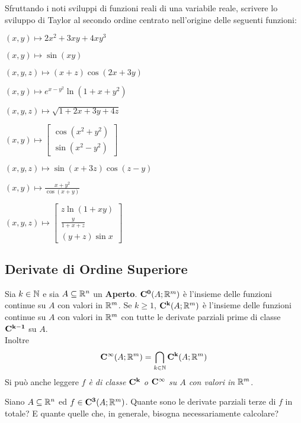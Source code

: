 \begin{exercise}
	Sfruttando i noti sviluppi di funzioni reali di una variabile reale, scrivere lo sviluppo di Taylor al secondo ordine centrato nell'origine delle seguenti funzioni:
	\begin{itemize}
		\begin{minipage}{0.33\linewidth}
			\item $(x,y) \mapsto 2x^2 + 3xy + 4xy^3$
			\item $(x,y) \mapsto \sin(xy)$
			\item $(x,y,z) \mapsto (x+z) \cos (2x+3y)$
		\end{minipage}
		\begin{minipage}{0.33\linewidth}
			\item $(x,y) \mapsto e^{x-y^2} \ln(1+x+y^2)$
			\item $(x,y,z) \mapsto \sqrt{1+2x+3y+4z}$
			\item $(x,y) \mapsto \begin{bmatrix}
					\cos(x^2 + y^2)\\
					\sin(x^2 - y^2)
				\end{bmatrix}$
		\end{minipage}
		\begin{minipage}{0.33\linewidth}
			\item $(x,y,z) \mapsto \sin(x + 3z) \cos(z - y)$
			\item $(x,y) \mapsto \frac{x+y^2}{\cos (x+y)}$
			\item $(x,y,z) \mapsto \begin{bmatrix}
					z \ln (1 + xy)\\
					\frac{y}{1+x+z}\\
					(y + z) \sin x
				\end{bmatrix}$
		\end{minipage}
	\end{itemize}
\end{exercise}

\subsection{Derivate di Ordine Superiore}
\begin{definition}
	Sia $k \in \mathbb{N}$ e sia $A \subseteq \mathbb{R}^n$ un \textbf{Aperto}. $\mathbf{C^{0}}(A;\mathbb{R}^m)$ è l'insieme delle funzioni continue su $A$ con valori in $\mathbb{R}^m$. Se $k \geq 1$, $\mathbf{C^{k}}(A;\mathbb{R}^m)$ è l'insieme delle funzioni continue su $A$ con valori in $\mathbb{R}^m$ con tutte le derivate parziali prime di classe $\mathbf{C^{k-1}}$ su $A$.\\
	Inoltre
	\[\mathbf{C^{\infty}}(A;\mathbb{R}^m) = \bigcap\limits_{k \in \mathbb{N}}\mathbf{C^{k}}(A;\mathbb{R}^m)\]
	Si può anche leggere \textit{$f$ è di classe $\mathbf{C^{k}}$ o $\mathbf{C^{\infty}}$ su $A$ con valori in $\mathbb{R}^m$}.
\end{definition}
\begin{exercise}
	Siano $A \subseteq \mathbb{R}^n$ ed $f \in \mathbf{C^{3}}(A;\mathbb{R}^m)$. Quante sono le derivate parziali terze di $f$ in totale? E quante quelle che, in generale, bisogna necessariamente calcolare?
\end{exercise}

